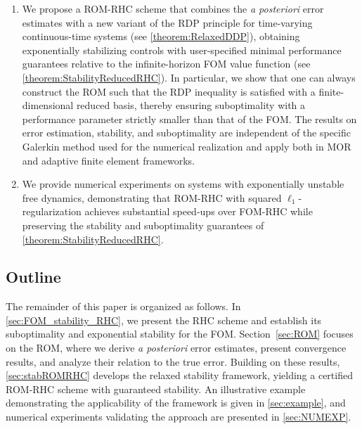 \documentclass{m2an}
\begin{document}
\begin{enumerate}
    \item We propose a ROM-RHC scheme that combines the \emph{a posteriori} error estimates with a new variant of the RDP principle for time-varying continuous-time systems (see \cref{theorem:RelaxedDDP}), obtaining exponentially stabilizing controls with user-specified minimal performance guarantees relative to the infinite-horizon FOM value function (see \cref{theorem:StabilityReducedRHC}). 
    In particular, we show that one can always construct the ROM such that the RDP inequality is satisfied with a finite-dimensional reduced basis, thereby ensuring suboptimality with a performance parameter strictly smaller than that of the FOM. The results on error estimation, stability, and suboptimality are independent of the specific Galerkin method used for the numerical realization and apply both in MOR and adaptive finite element frameworks.
    
    \item We provide numerical experiments on systems with exponentially unstable free dynamics, demonstrating that ROM-RHC with squared $\ell_1$-regularization achieves substantial speed-ups over FOM-RHC while preserving the stability and suboptimality guarantees of \cref{theorem:StabilityReducedRHC}.     
 \end{enumerate}
%
\subsection{Outline}
The remainder of this paper is organized as follows. In \cref{sec:FOM_stability_RHC}, we present the RHC scheme and establish its suboptimality and exponential stability for the FOM. Section~\ref{sec:ROM} focuses on the ROM, where we derive \emph{a posteriori} error estimates, present convergence results, and analyze their relation to the true error. Building on these results, \cref{sec:stabROMRHC} develops the relaxed stability framework, yielding a certified ROM-RHC scheme with guaranteed stability. An illustrative example demonstrating the applicability of the framework is given in \cref{sec:example}, and numerical experiments validating the approach are presented in \cref{sec:NUMEXP}.
%
\end{document}
